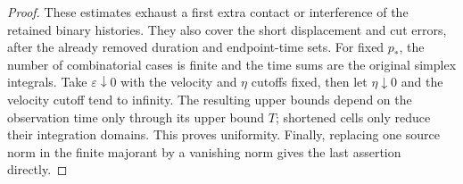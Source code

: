 \begin{proof}
These estimates exhaust a first extra contact or interference of the
retained binary histories.  They also cover the short displacement and
cut errors, after the already removed duration and endpoint-time sets.
For fixed $p_*$, the number of combinatorial cases is finite and the time
sums are the original simplex integrals.  Take
$\varepsilon\downarrow0$ with the velocity and $\eta$ cutoffs fixed, then
let $\eta\downarrow0$ and the velocity cutoff tend to infinity.  The
resulting upper bounds depend on the observation time only through its
upper bound $T$; shortened cells only reduce their integration domains.
This proves uniformity.  Finally, replacing one source norm in the finite
majorant by a vanishing norm gives the last assertion directly.
\end{proof}
